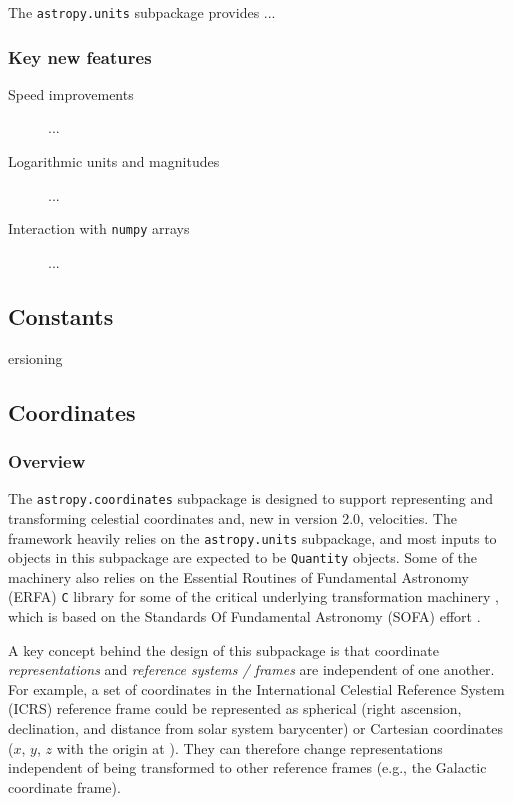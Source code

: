 \documentclass[modern]{aastex61}
\newcommand{\package}[1]{\texttt{#1}\xspace}
\newcommand{\inlinecomment}[2]{\todo[inline]{#1: #2}\xspace}
\begin{document}
The \package{astropy.units} subpackage provides ...

\subsubsection{Key new features}

\begin{description}
    \item[Speed improvements] ...
    \item[Logarithmic units and magnitudes] ...
    \item[Interaction with \package{numpy} arrays] ...
\end{description}

\subsection{Constants}

\inlinecomment{David S.}

versioning


\subsection{Coordinates}
\label{sec:coordinates}

\subsubsection{Overview}
The \package{astropy.coordinates} subpackage is designed to support representing
and transforming celestial coordinates and, new in version 2.0, velocities.
The framework heavily relies on the \package{astropy.units} subpackage, and most
inputs to objects in this subpackage are expected to be \texttt{Quantity}
objects.
Some of the machinery also relies on the Essential Routines of Fundamental
Astronomy (ERFA) \texttt{C} library for some of the critical underlying
transformation machinery \citep{erfa}, which is based on the Standards Of 
Fundamental Astronomy (SOFA) effort \citep{sofa}.


A key concept behind the design of this subpackage is that coordinate
\textit{representations} and \textit{reference systems / frames} are independent
of one another.
For example, a set of coordinates in the International Celestial Reference
System (ICRS) reference frame could be represented as spherical (right
ascension, declination, and distance from solar system barycenter) or Cartesian
coordinates ($x$, $y$, $z$ with the origin at ).
They can therefore change representations independent of being transformed to
other reference frames (e.g., the Galactic coordinate frame).
\end{document}
